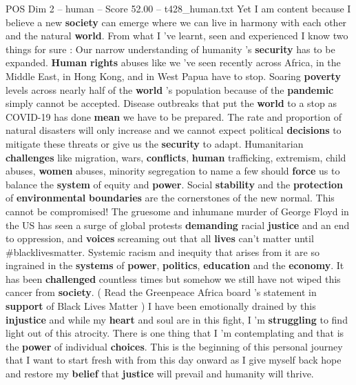\begin{textsample}{POS Dim 2 – human – Score 52.00 – t428\_human.txt}
Yet I am content because I believe a new \textbf{society} can emerge where we can live in harmony with each other and the natural \textbf{world}.
From what I ’ve learnt, seen and experienced I know two things for sure : Our narrow understanding of humanity ’s \textbf{security} has to be expanded. \textbf{Human} \textbf{rights} abuses like we ’ve seen recently across Africa, in the Middle East, in Hong Kong, and in West Papua have to stop.
Soaring \textbf{poverty} levels across nearly half of the \textbf{world} ’s population because of the \textbf{pandemic} simply cannot be accepted.
Disease outbreaks that put the \textbf{world} to a stop as COVID-19 has done \textbf{mean} we have to be prepared.
The rate and proportion of natural disasters will only increase and we cannot expect political \textbf{decisions} to mitigate these threats or give us the \textbf{security} to adapt.
Humanitarian \textbf{challenges} like migration, wars, \textbf{conflicts}, \textbf{human} trafficking, extremism, child abuses, \textbf{women} abuses, minority segregation to name a few should \textbf{force} us to balance the \textbf{system} of equity and \textbf{power}.
Social \textbf{stability} and the \textbf{protection} of \textbf{environmental} \textbf{boundaries} are the cornerstones of the new normal.
This cannot be compromised!
The gruesome and inhumane murder of George Floyd in the US has seen a surge of global protests \textbf{demanding} racial \textbf{justice} and an end to oppression, and \textbf{voices} screaming out that all \textbf{lives} can't matter until \#blacklivesmatter.
Systemic racism and inequity that arises from it are so ingrained in the \textbf{systems} of \textbf{power}, \textbf{politics}, \textbf{education} and the \textbf{economy}.
It has been \textbf{challenged} countless times but somehow we still have not wiped this cancer from \textbf{society}. ( Read the Greenpeace Africa board ’s statement in \textbf{support} of Black Lives Matter ) I have been emotionally drained by this \textbf{injustice} and while my \textbf{heart} and soul are in this fight, I ’m \textbf{struggling} to find light out of this atrocity.
There is one thing that I ’m contemplating and that is the \textbf{power} of individual \textbf{choices}.
This is the beginning of this personal journey that I want to start fresh with from this day onward as I give myself back hope and restore my \textbf{belief} that \textbf{justice} will prevail and humanity will thrive.

\end{textsample}
